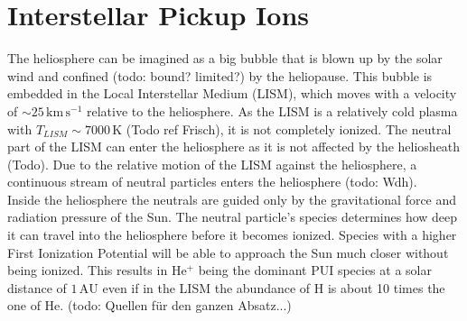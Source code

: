 \section{Interstellar Pickup Ions}
The heliosphere can be imagined as a big bubble that is blown up by the solar wind and confined (todo: bound? limited?) by the heliopause. This bubble is embedded in the Local Interstellar Medium (LISM), which moves with a velocity of $\sim 25\,\mathrm{km\,s^{-1}}$ relative to the heliosphere. As the LISM is a relatively cold plasma with $T_{LISM} \sim 7000\,\mathrm{K}$ (Todo ref Frisch), it is not completely ionized. The neutral part of the LISM can enter the heliosphere as it is not affected by the heliosheath (Todo). Due to the relative motion of the LISM against the heliosphere, a continuous stream of neutral particles enters the heliosphere (todo: Wdh).\\
Inside the heliosphere the neutrals are guided only by the gravitational force and radiation pressure of the Sun. The neutral particle's species determines how deep it can travel into the heliosphere before it becomes ionized. Species with a higher First Ionization Potential will be able to approach the Sun much closer without being ionized. This results in $\mathrm{He^{+}}$ being the dominant PUI species at a solar distance of $1\,\mathrm{AU}$ even if in the LISM the abundance of $\mathrm{H}$ is about 10 times the one of $\mathrm{He}$. (todo: Quellen für den ganzen Absatz...)

